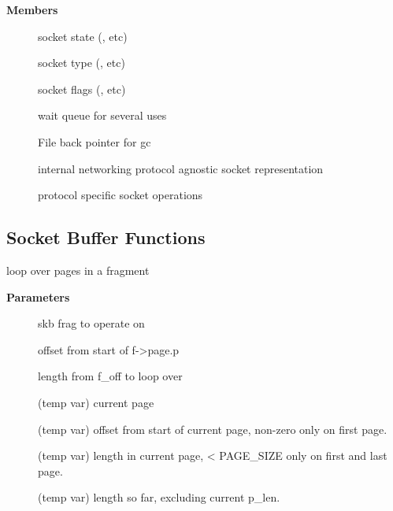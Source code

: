 \documentclass[a4paper,8pt,english]{sphinxmanual}
\begin{document}
\textbf{Members}
\begin{description}
\item[{}] \leavevmode
socket state (, etc)

\item[{}] \leavevmode
socket type (, etc)

\item[{}] \leavevmode
socket flags (, etc)

\item[{}] \leavevmode
wait queue for several uses

\item[{}] \leavevmode
File back pointer for gc

\item[{}] \leavevmode
internal networking protocol agnostic socket representation

\item[{}] \leavevmode
protocol specific socket operations

\end{description}


\subsection{Socket Buffer Functions}
\label{networking/kapi:socket-buffer-functions}

\begin{fulllineitems}
\label{networking/kapi:c.skb_frag_foreach_page}
loop over pages in a fragment

\end{fulllineitems}


\textbf{Parameters}
\begin{description}
\item[{}] \leavevmode
skb frag to operate on

\item[{}] \leavevmode
offset from start of f-\textgreater{}page.p

\item[{}] \leavevmode
length from f\_off to loop over

\item[{}] \leavevmode
(temp var) current page

\item[{}] \leavevmode
(temp var) offset from start of current page,
non-zero only on first page.

\item[{}] \leavevmode
(temp var) length in current page,
\textless{} PAGE\_SIZE only on first and last page.

\item[{}] \leavevmode
(temp var) length so far, excluding current p\_len.

\end{description}
\end{document}
